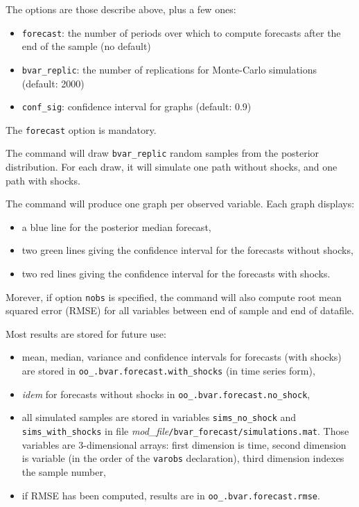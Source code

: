 \documentclass[10pt,a4paper]{article}
\begin{document}
The options are those describe above, plus a few ones:
\begin{itemize}
\item \texttt{forecast}: the number of periods over which to compute forecasts after the end of the sample (no default)
\item \texttt{bvar\_replic}: the number of replications for Monte-Carlo simulations (default: 2000)
\item \texttt{conf\_sig}: confidence interval for graphs (default: 0.9)
\end{itemize}

The \texttt{forecast} option is mandatory.

The command will draw \texttt{bvar\_replic} random samples from the posterior distribution. For each draw, it will simulate one path without shocks, and one path with shocks.


The command will produce one graph per observed variable. Each graph displays:
\begin{itemize}
\item a blue line for the posterior median forecast,%
\item two green lines giving the confidence interval for the forecasts without shocks,
\item two red lines giving the confidence interval for the forecasts with shocks.
\end{itemize}

Morever, if option \texttt{nobs} is specified, the command will also compute root mean squared error (RMSE) for all variables between end of sample and end of datafile.

Most results are stored for future use:
\begin{itemize}
\item mean, median, variance and confidence intervals for forecasts (with shocks) are stored in \texttt{oo\_.bvar.forecast.with\_shocks} (in time series form),
\item \textit{idem} for forecasts without shocks in \texttt{oo\_.bvar.forecast.no\_shock},
\item all simulated samples are stored in variables \texttt{sims\_no\_shock} and \texttt{sims\_with\_shocks} in file \textit{mod\_file}\texttt{/bvar\_forecast/simulations.mat}. Those variables are 3-dimensional arrays: first dimension is time, second dimension is variable (in the order of the \texttt{varobs} declaration), third dimension indexes the sample number,
\item if RMSE has been computed, results are in \texttt{oo\_.bvar.forecast.rmse}.
\end{itemize}
\end{document}
